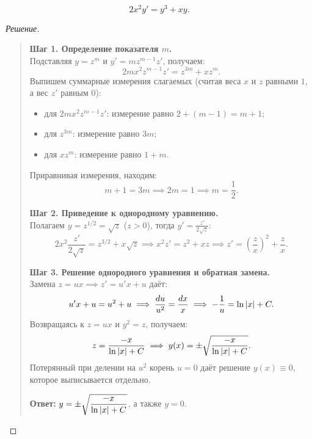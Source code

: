 \begin{example} ~
    \begin{equation} \label{eq:l6_gen_hom_ex}
        2 x^2 y' = y^3 + x y. \tag{2}
    \end{equation}

    \begin{proof}[Решение]~\\
        \begin{quote}
            \textbf{Шаг 1. Определение показателя $m$.}\\
            Подставляя $y = z^m$ и $y' = m z^{m-1} z'$, получаем:
            \[
                2 m x^2 z^{m-1} z' = z^{3m} + x z^m.
            \]
            Выпишем суммарные измерения слагаемых (считая веса $x$ и $z$
            равными $1$, а вес $z'$ равным $0$):
            \begin{itemize}
                \item для $2 m x^2 z^{m-1} z'$: измерение равно $2 + (m - 1) = m + 1$;
                \item для $z^{3m}$: измерение равно $3m$;
                \item для $x z^m$: измерение равно $1 + m$.
            \end{itemize}
            Приравнивая измерения, находим:
            \[
                m + 1 = 3m \implies 2m = 1 \implies m = \frac{1}{2}.
            \]

            \textbf{Шаг 2. Приведение к однородному уравнению.}\\
            Полагаем $y = z^{1/2} = \sqrt{z}$ ($z > 0$), тогда
            $y' = \frac{z'}{2\sqrt{z}}$:
            \[
                2 x^2 \frac{z'}{2\sqrt{z}} = z^{3/2} + x \sqrt{z}
                \implies x^2 z' = z^2 + x z \implies
                z' = \left(\frac{z}{x}\right)^2 + \frac{z}{x}.
            \]

            \textbf{Шаг 3. Решение однородного уравнения и обратная замена.}\\
            Замена $z = u x \implies z' = u' x + u$ даёт:
            \[
                u' x + u = u^2 + u \implies \frac{du}{u^2} = \frac{dx}{x}
                \implies -\frac{1}{u} = \ln \left| x \right| + C.
            \]
            Возвращаясь к $z = u x$ и $y^2 = z$, получаем:
            \[
                z = \frac{-x}{\ln \left| x \right| + C} \implies
                y(x) = \pm \sqrt{\frac{-x}{\ln \left| x \right| + C}}.
            \]
            Потерянный при делении на $u^2$ корень $u = 0$ даёт решение
            $y(x) \equiv 0$, которое выписывается отдельно.

            \textbf{Ответ:} $y = \pm \sqrt{\dfrac{-x}{\ln \left| x \right| + C}}$, а
            также $y = 0$.
        \end{quote}
    \end{proof}
\end{example}

